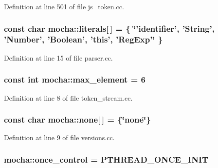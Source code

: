 Definition at line 501 of file js\_\-token.cc.

\hypertarget{namespacemocha_a26281cbe58723001ac1ce3442687794b}{
\subsubsection[{literals}]{\setlength{\rightskip}{0pt plus 5cm}const char {\bf mocha::literals}\mbox{[}$\,$\mbox{]} = \{ \char`\"{}'identifier', 'String', 'Number', 'Boolean', 'this', 'RegExp'\char`\"{} \}}}
\label{namespacemocha_a26281cbe58723001ac1ce3442687794b}


Definition at line 15 of file parser.cc.

\hypertarget{namespacemocha_a7c62b652d237959c56aa0f587d471292}{
\subsubsection[{max\_\-element}]{\setlength{\rightskip}{0pt plus 5cm}const int {\bf mocha::max\_\-element} = 6}}
\label{namespacemocha_a7c62b652d237959c56aa0f587d471292}


Definition at line 8 of file token\_\-stream.cc.

\hypertarget{namespacemocha_a41c47432f901b513e9caefbcb4a96f1f}{
\subsubsection[{none}]{\setlength{\rightskip}{0pt plus 5cm}const char {\bf mocha::none}\mbox{[}$\,$\mbox{]} = \{\char`\"{}none\char`\"{}\}}}
\label{namespacemocha_a41c47432f901b513e9caefbcb4a96f1f}


Definition at line 9 of file versions.cc.

\hypertarget{namespacemocha_a0c44d2795b49b8b8b69a9ce4945bdeec}{
\subsubsection[{once\_\-control}]{ {\bf mocha::once\_\-control} = PTHREAD\_\-ONCE\_\-INIT}}
\label{namespacemocha_a0c44d2795b49b8b8b69a9ce4945bdeec}


